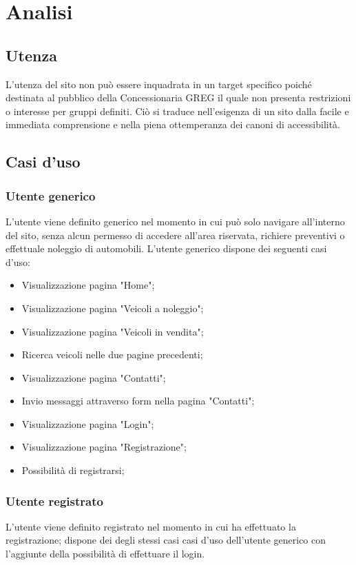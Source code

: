 \section{Analisi}

    \subsection{Utenza}
        L'utenza del sito non può essere inquadrata in un target specifico poiché destinata al pubblico della Concessionaria GREG il quale non presenta restrizioni o interesse per gruppi definiti. Ciò si traduce nell'esigenza di un sito dalla facile e immediata comprensione e nella piena ottemperanza dei canoni di accessibilità.

    \subsection{Casi d'uso}

        \subsubsection{Utente generico}
        L’utente viene definito generico nel momento in cui può solo navigare all’interno del sito, senza alcun permesso di accedere all’area riservata, richiere preventivi o effettuale noleggio di automobili.
        L’utente generico dispone dei seguenti casi d’uso:
        \begin{itemize}
            \item Visualizzazione pagina "Home";
            \item Visualizzazione pagina "Veicoli a noleggio";
            \item Visualizzazione pagina "Veicoli in vendita";
            \item Ricerca veicoli nelle due pagine precedenti;
            \item Visualizzazione pagina "Contatti";
            \item Invio messaggi attraverso form nella pagina "Contatti";
            \item Visualizzazione pagina "Login";
            \item Visualizzazione pagina "Registrazione";
            \item Possibilità di registrarsi;
        \end{itemize}

        \subsubsection{Utente registrato}
        L’utente viene definito registrato nel momento in cui ha effettuato la registrazione; dispone dei degli stessi casi casi d’uso dell'utente generico con l'aggiunte della possibilità di effettuare il login.

